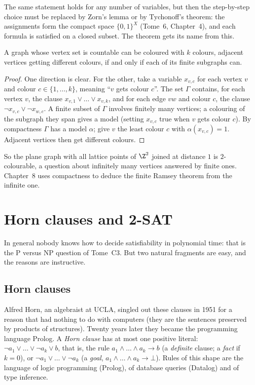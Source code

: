 The same statement holds for any number of variables, but then the step-by-step choice must be replaced by Zorn's
lemma or by Tychonoff's theorem: the assignments form the compact space $\{0,1\}^X$ (Tome~6, Chapter~4), and each formula is
satisfied on a closed subset. The theorem gets its name from this.

\begin{corollary}\label{cor:debruijnerdos}
A graph whose vertex set is countable can be coloured with $k$ colours, adjacent vertices getting different colours, if
and only if each of its finite subgraphs can.
\end{corollary}
\begin{proof}
One direction is clear. For the other, take a variable $x_{v,c}$ for each vertex $v$ and colour $c\in\{1,\dots,k\}$, meaning ``$v$ gets colour $c$''.
The set $\Gamma$ contains, for each vertex $v$, the clause $x_{v,1}\lor\dots\lor x_{v,k}$, and for each edge $vw$ and colour $c$, the clause $\neg x_{v,c}\lor\neg x_{w,c}$. A
finite subset of $\Gamma$ involves finitely many vertices; a colouring of the subgraph they span gives a model (setting $x_{v,c}$ true
when $v$ gets colour $c$). By compactness $\Gamma$ has a model $\alpha$; give $v$ the least colour $c$ with $\alpha(x_{v,c})=1$. Adjacent vertices then get
different colours.
\end{proof}

So the plane graph with all lattice points of $\Z^2$ joined at distance $1$ is $2$-colourable, a question about infinitely many
vertices answered by finite ones. Chapter~8 uses compactness to deduce the finite Ramsey theorem from the infinite one.

\section{Horn clauses and 2-SAT}\label{sec:twosat}

In general nobody knows how to decide satisfiability in polynomial time: that is the P versus NP question of Tome~C3.
But two natural fragments are easy, and the reasons are instructive.

\subsection*{Horn clauses}

Alfred Horn, an algebraist at UCLA, singled out these clauses in 1951 for a reason that had nothing to do with
computers (they are the sentences preserved by products of structures). Twenty years later they became the
programming language Prolog. A \emph{Horn clause} has at most one positive literal: $\neg a_1\lor\dots\lor\neg a_k\lor b$, that is, the rule $a_1\land\dots\land a_k\to b$ (a \emph{definite} clause; a
\emph{fact} if $k=0$), or $\neg a_1\lor\dots\lor\neg a_k$ (a \emph{goal}, $a_1\land\dots\land a_k\to\bot$). Rules of this shape are the language of logic
programming (Prolog), of database queries (Datalog) and of type inference.

